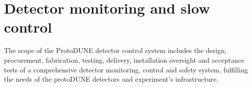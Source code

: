 










\section{Detector monitoring and slow control}
\label{sec:slowcontrol}
The scope of the ProtoDUNE detector control system includes the design, procurement, fabrication, testing,
delivery, installation oversight and acceptance tests of a comprehensive detector monitoring, control and safety system,
fulfilling the needs of the protoDUNE detectors and experiment's infrastructure.

